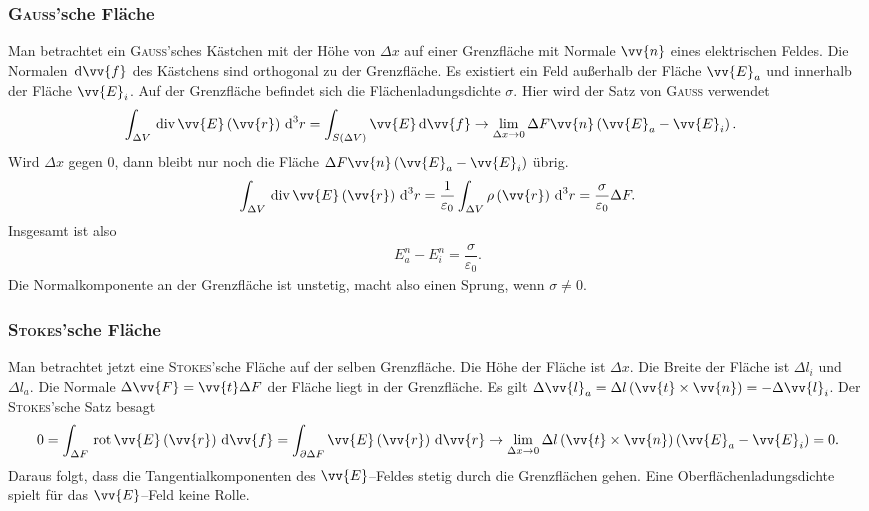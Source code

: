 \documentclass[a4paper,12pt]{article}
\newcommand{\td}{\,\text{d}}
\numberwithin{equation}{section}
\begin{document}
\subsubsection{\textsc{Gauss}'sche Fläche}
Man betrachtet ein \textsc{Gauss}'sches Kästchen mit der Höhe von $\Delta x$ auf einer Grenzfläche mit Normale $\vv{n}$ eines elektrischen Feldes. Die Normalen $\td \vv{f}$ des Kästchens sind orthogonal zu der Grenzfläche. Es existiert ein Feld außerhalb der Fläche $\vv{E}_a$ und innerhalb der Fläche $\vv{E}_i$. Auf der Grenzfläche befindet sich die Flächenladungsdichte $\sigma $. Hier wird der Satz von \textsc{Gauss} verwendet
\begin{align} 
        \int_{\Delta V}^{}\,\text{div}\,\vv{E}\left(\vv{r}\right)\td ^3r&=\int_{S\left(\Delta V\right)}^{}\vv{E}\td \vv{f}\rightarrow \lim_{\Delta x\rightarrow 0}\Delta F\vv{n}\left(\vv{E}_a-\vv{E}_i\right)
.\end{align} 
Wird $\Delta x$ gegen 0, dann bleibt nur noch die Fläche $\Delta F\vv{n}\left(\vv{E}_a-\vv{E}_i\right)$ übrig.
\begin{align} 
        \int_{\Delta V}^{}\,\text{div}\,\vv{E}\left(\vv{r}\right)\td ^3r=\dfrac{1}{\varepsilon _0}\int_{\Delta V}^{}\rho \left(\vv{r}\right)\td ^3r=\dfrac{\sigma }{\varepsilon _0}\Delta F
.\end{align} 
Insgesamt ist also
\begin{align} 
        E_a^n-E_i^n=\dfrac{\sigma }{\varepsilon _0}
.\end{align} 
Die Normalkomponente an der Grenzfläche ist unstetig, macht also einen Sprung, wenn $\sigma \neq 0$.

\subsubsection{\textsc{Stokes}'sche Fläche}
Man betrachtet jetzt eine \textsc{Stokes}'sche Fläche auf der selben Grenzfläche. Die Höhe der Fläche ist $\Delta x$. Die Breite der Fläche ist $\Delta l_i$ und $\Delta l_a$. Die Normale $\Delta \vv{F}=\vv{t}\Delta F$ der Fläche liegt in der Grenzfläche. Es gilt $\Delta \vv{l}_a=\Delta l\left(\vv{t}\times \vv{n}\right)=-\Delta \vv{l}_i$. Der \textsc{Stokes}'sche Satz besagt
\begin{align} 
        0=\int_{\Delta F}^{}\,\text{rot}\,\vv{E}\left(\vv{r}\right)\td \vv{f}=\int_{\partial \Delta F}^{}\vv{E}\left(\vv{r}\right)\td \vv{r}\rightarrow \lim_{\Delta x\rightarrow 0}\Delta l\left(\vv{t}\times \vv{n}\right)\left(\vv{E}_a-\vv{E}_i\right)=0
.\end{align} 
Daraus folgt, dass die Tangentialkomponenten des $\vv{E}$--Feldes stetig durch die Grenzflächen gehen. Eine Oberflächenladungsdichte spielt für das $\vv{E}$--Feld keine Rolle.
\end{document}
